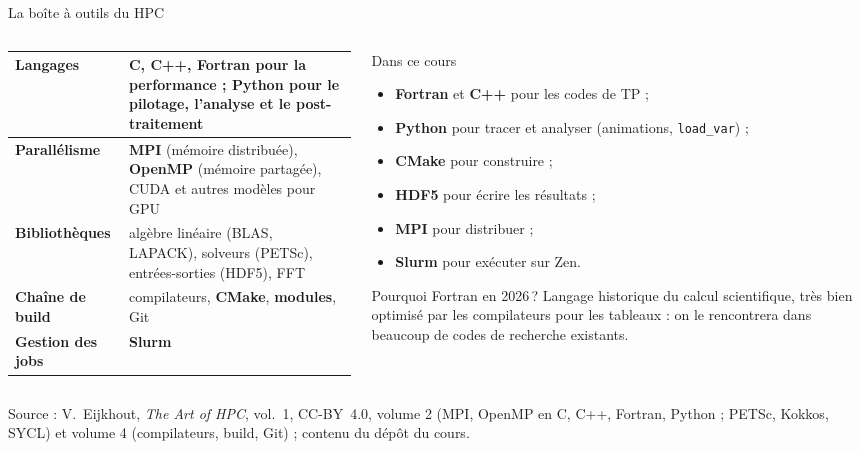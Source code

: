 \documentclass[8pt,aspectratio=169]{beamer}
\newcommand{\src}[1]{\vfill{\tiny\color{gray}Source : #1\par}}
\newcommand{\eij}{V.~Eijkhout, \emph{The Art of HPC}, vol.~1, CC-BY~4.0}
\begin{document}
\begin{frame}{La boîte à outils du HPC}
\begin{columns}[T]
\begin{column}{0.5\textwidth}
\begin{tabular}{@{}L{2.4cm}L{5.0cm}@{}}
\toprule
\textbf{Langages} & \textbf{C, C++, Fortran} pour la performance ; \textbf{Python} pour le pilotage, l'analyse et le post-traitement\\
\midrule
\textbf{Parallélisme} & \textbf{MPI} (mémoire distribuée), \textbf{OpenMP} (mémoire partagée), CUDA et autres modèles pour GPU\\
\midrule
\textbf{Bibliothèques} & algèbre linéaire (BLAS, LAPACK), solveurs (PETSc), entrées-sorties (HDF5), FFT\\
\midrule
\textbf{Chaîne de build} & compilateurs, \textbf{CMake}, \textbf{modules}, Git\\
\midrule
\textbf{Gestion des jobs} & \textbf{Slurm}\\
\bottomrule
\end{tabular}
\end{column}
\begin{column}{0.46\textwidth}
\begin{block}{Dans ce cours}
\begin{itemize}
\item \textbf{Fortran} et \textbf{C++} pour les codes de TP ;
\item \textbf{Python} pour tracer et analyser (animations, \texttt{load\_var}) ;
\item \textbf{CMake} pour construire ;
\item \textbf{HDF5} pour écrire les résultats ;
\item \textbf{MPI} pour distribuer ;
\item \textbf{Slurm} pour exécuter sur Zen.
\end{itemize}
\end{block}
\begin{exampleblock}{Pourquoi Fortran en 2026\,?}
Langage historique du calcul scientifique, très bien optimisé par les compilateurs pour les tableaux : on le rencontrera dans beaucoup de codes de recherche existants.
\end{exampleblock}
\end{column}
\end{columns}
\src{\eij{}, volume 2 (MPI, OpenMP en C, C++, Fortran, Python ; PETSc, Kokkos, SYCL) et volume 4 (compilateurs, build, Git) ; contenu du dépôt du cours.}
\end{frame}
\end{document}
